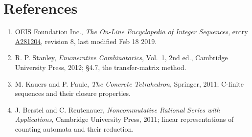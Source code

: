 \documentclass[11pt]{article}
\theoremstyle{definition}
\begin{document}
\section{References}

\begin{enumerate}

\item OEIS Foundation Inc., \emph{The On-Line Encyclopedia of Integer Sequences}, entry \href{https://oeis.org/A281204}{A281204}, revision 8, last modified Feb 18 2019.

\item R. P. Stanley, \emph{Enumerative Combinatorics}, Vol.~1, 2nd ed., Cambridge University Press, 2012; \S4.7, the transfer-matrix method.

\item M. Kauers and P. Paule, \emph{The Concrete Tetrahedron}, Springer, 2011; C-finite sequences and their closure properties.

\item J. Berstel and C. Reutenauer, \emph{Noncommutative Rational Series with Applications}, Cambridge University Press, 2011; linear representations of counting automata and their reduction.

\end{enumerate}
\end{document}
